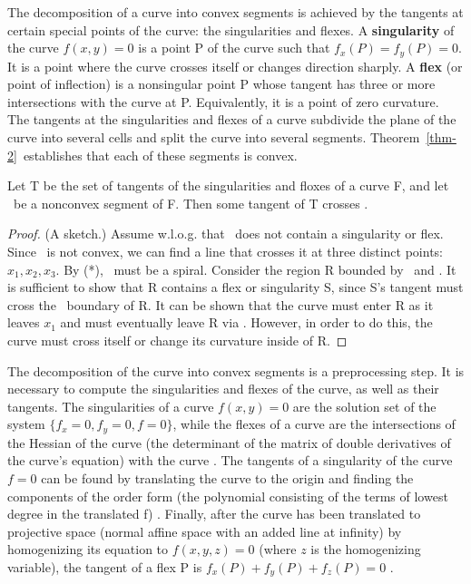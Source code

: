 The decomposition of a curve into convex segments is achieved by
the tangents at certain special points of the curve: the 
singularities and flexes.
A {\bf singularity} of the curve $f(x,y)=0$ is a point P of the curve
such that $f_{x}(P) = f_{y}(P) = 0$.
It is a point where the curve crosses itself or changes direction sharply.
A {\bf flex} (or point of inflection) is a nonsingular point P 
whose tangent has three or more intersections with the curve at P.
Equivalently, it is a point of zero curvature.
The tangents at the singularities and flexes of a curve 
subdivide the plane of the curve into several cells and split the curve 
into several segments.  
Theorem~\ref{thm-2}\ establishes that each of these segments is convex.
%
\begin{theorem}
\label{thm-2}
Let T be the set of tangents of the singularities and floxes of a curve F,
and let \ be a nonconvex segment of F.
Then some tangent of T crosses . 
\end{theorem}
\begin{proof}
(A sketch.) Assume w.l.o.g. that \ does
\marginpar{(*)}
not contain a singularity or flex.
Since \ is not convex, we can find a line that crosses it at
three distinct points: $x_{1}, x_{2}, x_{3}$.
By (*), \ must be a spiral.
Consider the region R bounded by \ and .
It is sufficient to show that R contains a flex or singularity S,
since S's tangent must cross the \ boundary of R.
It can be shown that the curve must enter R as it leaves $x_{1}$ and
must eventually leave R via .
However, in order to do this, the curve must cross itself or change its
curvature inside of R.
\end{proof}

The decomposition of the curve into convex segments is a preprocessing step.
It is necessary to compute the singularities and flexes of the curve, 
as well as their tangents.
The singularities of a curve $f(x,y)=0$ are the solution set of the system
$\{f_{x}=0,f_{y}=0,f=0\}$,
while the flexes of a curve are the intersections of the
Hessian of the curve (the determinant of the matrix of double derivatives of 
the curve's equation) with the curve \cite{wa}.
The tangents of a singularity of the curve $f=0$ 
can be found by translating the curve to
the origin and finding the components of the order form (the polynomial
consisting of the terms of lowest degree in the translated f) \cite{wa}.
Finally,  after the curve has been translated to projective space (normal affine
space with an added line at infinity) by homogenizing its equation to
$f(x,y,z)=0$ (where $z$ is the homogenizing variable),
the tangent of a flex P
is $f_{x}(P) + f_{y}(P) + f_{z}(P) = 0$ \cite{wa}.

